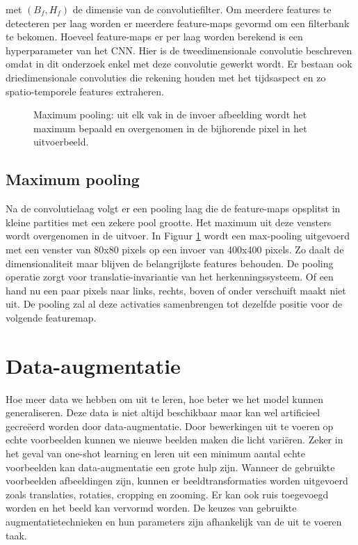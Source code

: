 \npar met $(B_f, H_f)$ de dimensie van de convolutiefilter. Om meerdere features te detecteren per laag worden er meerdere feature-maps gevormd om een filterbank te bekomen. Hoeveel feature-maps er per laag worden berekend is een hyperparameter van het CNN. Hier is de tweedimensionale convolutie beschreven omdat in dit onderzoek enkel met deze convolutie gewerkt wordt. Er bestaan ook driedimensionale convoluties die rekening houden met het tijdsaspect en zo spatio-temporele features extraheren.

\begin{figure}[b!]
	\centering
	
	\caption{Maximum pooling: uit elk vak in de invoer afbeelding wordt het maximum bepaald en overgenomen in de bijhorende pixel in het uitvoerbeeld.}
	\label{fig:max-pooling}
\end{figure}\textsl{\textsl{}}
\subsection{Maximum pooling}


Na de convolutielaag volgt er een pooling laag die de feature-maps opsplitst in kleine partities met een zekere pool grootte. Het maximum uit deze vensters wordt overgenomen in de uitvoer. In Figuur \ref{fig:max-pooling} wordt een max-pooling uitgevoerd met een venster van 80x80 pixels op een invoer van 400x400 pixels. Zo daalt de dimensionaliteit maar blijven de belangrijkste features behouden.
\npar De pooling operatie zorgt voor translatie-invariantie van het herkenningssysteem. Of een hand nu een paar pixels naar links, rechts, boven of onder verschuift maakt niet uit. De pooling zal al deze activaties samenbrengen tot dezelfde positie voor de volgende featuremap. 

\section{Data-augmentatie}\label{sec:data-augm}
Hoe meer data we hebben om uit te leren, hoe beter we het model kunnen generaliseren. Deze data is niet altijd beschikbaar maar kan wel artificieel gecre\"eerd worden door data-augmentatie. Door bewerkingen uit te voeren op echte voorbeelden kunnen we nieuwe beelden maken die licht vari\"eren.
\npar Zeker in het geval van one-shot learning en leren uit een minimum aantal echte voorbeelden kan data-augmentatie een grote hulp zijn. Wanneer de gebruikte voorbeelden afbeeldingen zijn, kunnen er beeldtransformaties worden uitgevoerd zoals translaties, rotaties, cropping en zooming. Er kan ook ruis toegevoegd worden en het beeld kan vervormd worden. De keuzes van gebruikte augmentatietechnieken en hun parameters zijn afhankelijk van de uit te voeren taak. 
